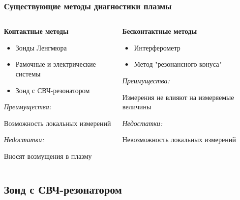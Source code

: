 \documentclass[10pt,pdf,hyperref={unicode}, dvipsnames]{beamer}
\begin{document}
\begin{frame}[t]\frametitle{Существующие методы диагностики плазмы}
	\begin{columns}[t]
		\begin{column}{0.5\textwidth}
			{\centering\textbf{Контактные методы}
			\begin{itemize}
				\item Зонды Ленгмюра
				\item Рамочные и электрические  системы
				\item Зонд с СВЧ-резонатором
			\end{itemize}}
			\bigbreak
			\textit{Преимущества:}

			Возможность локальных измерений

			\bigbreak
			\textit{Недостатки:}

			Вносят возмущения в плазму

		\end{column}

		\begin{column}{0.5\textwidth}
		 	{\centering \textbf{Бесконтактные методы}
		 	\begin{itemize}
		 		\item Интерферометр
		 		\item Метод "резонансного конуса"
		 	\end{itemize}}
		 	\bigbreak
		 	\textit{Преимущества:}

			Измерения не влияют на измеряемые величины

			\bigbreak
			\textit{Недостатки:}

			Невозможность локальных измерений
		\end{column}



	\end{columns}
	    


\end{frame}

\subsection{Зонд с СВЧ-резонатором} %
\end{document}
